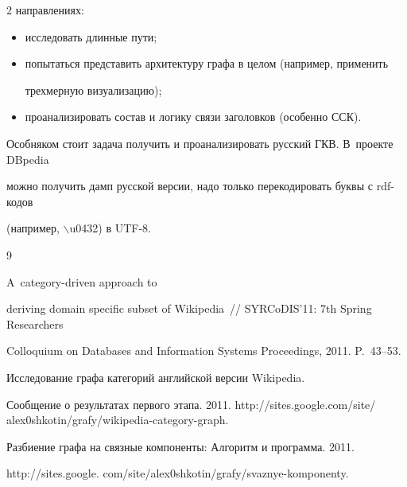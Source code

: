 \begin{multicols}{2}
на\-прав\-ле\-ни\-ях:

   \begin{itemize}

   \item исследовать длинные пути;

   \item попытаться представить архитектуру графа в целом (например, применить 

   трехмерную визуализацию);

   \item проанализировать состав и логику связи заголовков (особенно ССК).

   \end{itemize}

   

   Особняком стоит задача получить и проанализировать русский ГКВ. В~проекте DBpedia 

можно получить дамп русской версии, надо только перекодировать буквы с rdf-кодов 

(например, $\backslash$u0432) в UTF-8.

   

{\small\frenchspacing

{%


\begin{thebibliography}{9}




 A~category-driven approach to 

deriving domain specific subset of Wikipedia~// SYRCoDIS'11: 7th Spring Researchers 

Colloquium on Databases and Information Systems Proceedings, 2011. P.~43--53.


 Исследование графа категорий английской версии Wikipedia. 

Сообщение о результатах первого этапа. 2011. {\sf http://sites.google.com/site/ alex0shkotin/grafy/wikipedia-category-graph}.


 Разбиение графа на связные компоненты: Алгоритм и программа. 2011. 

{\sf http://sites.google. com/site/alex0shkotin/grafy/svaznye-komponenty}.


\end{thebibliography}}}
\end{multicols}
